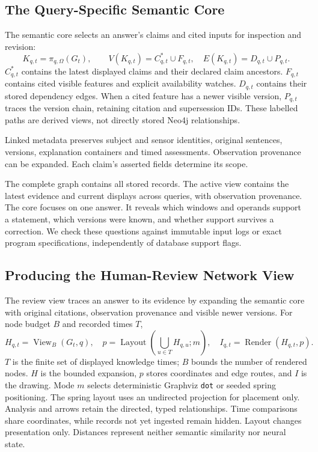 \documentclass[runningheads]{llncs}
\begin{document}
\subsection{The Query-Specific Semantic Core}

The semantic core selects an answer's claims and cited inputs for inspection
and revision:
\begin{equation}
 K_{q,t}=\pi_{q,\Omega}(G_t),\qquad
 V(K_{q,t})=C_{q,t}^{*}\cup F_{q,t},\quad
 E(K_{q,t})=D_{q,t}\cup P_{q,t}.
\label{eq:core}
\end{equation}
$C_{q,t}^{*}$ contains the latest displayed claims and their declared claim
ancestors. $F_{q,t}$ contains cited visible features and explicit availability
watches. $D_{q,t}$ contains their stored dependency edges.
When a cited feature has a newer visible version, $P_{q,t}$ traces the version
chain, retaining citation and supersession IDs. These labelled paths are
derived views, not directly stored Neo4j relationships.

Linked metadata preserves subject and sensor identities, original sentences,
versions, explanation containers and timed assessments.
Observation provenance can be expanded. Each claim's asserted fields
determine its scope.

The complete graph contains all stored records. The active view contains
the latest evidence and current displays across queries, with observation
provenance. The core focuses on one answer. It reveals which windows and
operands support a statement, which versions were known, and whether support
survives a correction. We check these questions against immutable input logs
or exact program specifications, independently of database support flags.





\subsection{Producing the Human-Review Network View}
\label{sec:reviewview}

The review view traces an answer to its evidence by expanding the semantic
core with original citations, observation provenance and visible newer
versions. For node budget $B$ and recorded times $T$,
\begin{equation}
 H_{q,t}=\operatorname{View}_B(G_t,q),\quad
 p=\operatorname{Layout}\!\left(\bigcup_{u\in T}H_{q,u};m\right),\quad
 I_{q,t}=\operatorname{Render}(H_{q,t},p).
\label{eq:reviewview}
\end{equation}
$T$ is the finite set of displayed knowledge times; $B$ bounds the number of
rendered nodes. $H$ is the bounded expansion, $p$ stores coordinates and edge routes,
and $I$ is the drawing. Mode $m$ selects deterministic Graphviz \texttt{dot}
or seeded spring positioning. The spring layout uses an undirected
projection for placement only. Analysis and arrows retain the directed,
typed relationships. Time comparisons share coordinates, while records
not yet ingested remain hidden. Layout changes presentation only.
Distances represent neither semantic similarity nor neural state.
\end{document}

